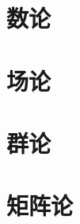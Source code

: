 \documentclass[UTF8]{ctexbook}
\begin{document}
{{ }%

\section{数论}{

 }%

\section{场论}{

 }%

\section{群论}{

 }%

\section{矩阵论}{

 }%

}%
\end{document}
